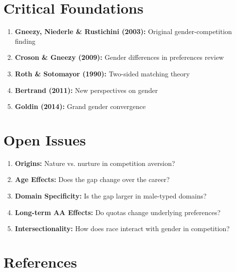 \section{Critical Foundations}

\begin{enumerate}
    \item \textbf{Gneezy, Niederle \& Rustichini (2003):} Original gender-competition finding
    \item \textbf{Croson \& Gneezy (2009):} Gender differences in preferences review
    \item \textbf{Roth \& Sotomayor (1990):} Two-sided matching theory
    \item \textbf{Bertrand (2011):} New perspectives on gender
    \item \textbf{Goldin (2014):} Grand gender convergence
\end{enumerate}

\section{Open Issues}

\begin{enumerate}
    \item \textbf{Origins:} Nature vs. nurture in competition aversion?
    \item \textbf{Age Effects:} Does the gap change over the career?
    \item \textbf{Domain Specificity:} Is the gap larger in male-typed domains?
    \item \textbf{Long-term AA Effects:} Do quotas change underlying preferences?
    \item \textbf{Intersectionality:} How does race interact with gender in competition?
\end{enumerate}

\section{References}

